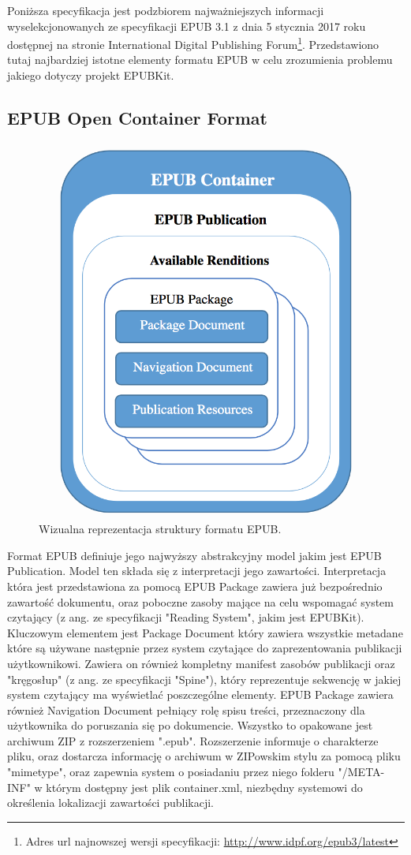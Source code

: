 Poniższa specyfikacja jest podzbiorem najważniejszych informacji wyselekcjonowanych ze specyfikacji EPUB 3.1 z dnia 5 stycznia 2017 roku dostępnej na stronie International Digital Publishing Forum\footnote{Adres url najnowszej wersji specyfikacji: \href{http://www.idpf.org/epub3/latest}{http://www.idpf.org/epub3/latest}}. Przedstawiono tutaj najbardziej istotne elementy formatu EPUB w celu zrozumienia problemu jakiego dotyczy projekt EPUBKit.

\subsection{EPUB Open Container Format}

\begin{figure}[ht!]
  \centering
  \includegraphics[width=.4\linewidth]{images/chapter-3-image-1-structure.png}
  \caption{Wizualna reprezentacja struktury formatu EPUB\cite{EPUBSpecificationRoadMap}.}
  \label{chapter-3-image-1-structure}
\end{figure}

Format EPUB definiuje jego najwyższy abstrakcyjny model jakim jest EPUB Publication. Model ten składa się z interpretacji jego zawartości. Interpretacja która jest przedstawiona za pomocą EPUB Package zawiera już bezpośrednio zawartość dokumentu, oraz poboczne zasoby mające na celu wspomagać system czytający (z ang. ze specyfikacji "Reading System", jakim jest EPUBKit). Kluczowym elementem jest Package Document który zawiera wszystkie metadane które są używane następnie przez system czytające do zaprezentowania publikacji użytkownikowi. Zawiera on również kompletny manifest zasobów publikacji oraz "kręgosłup" (z ang. ze specyfikacji "Spine"), który reprezentuje sekwencję w jakiej system czytający ma wyświetlać poszczególne elementy. EPUB Package zawiera również Navigation Document pełniący rolę spisu treści, przeznaczony dla użytkownika do poruszania się po dokumencie. Wszystko to opakowane jest archiwum ZIP z rozszerzeniem ".epub". Rozszerzenie informuje o charakterze pliku, oraz dostarcza informację o archiwum w ZIPowskim stylu za pomocą pliku "mimetype", oraz zapewnia system o posiadaniu przez niego folderu "/META-INF" w którym dostępny jest plik container.xml, niezbędny systemowi do określenia lokalizacji zawartości publikacji.

